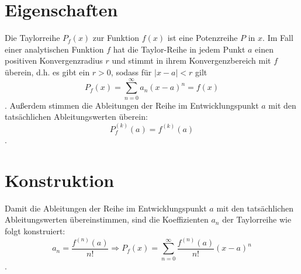 \section{Eigenschaften}
Die Taylorreihe \(P_f(x)\) zur Funktion \(f(x)\) ist eine Potenzreihe \(P\) in \(x\). Im Fall einer
analytischen Funktion \(f\) hat die Taylor-Reihe in jedem Punkt \(a\) einen positiven
Konvergenzradius \(r\) und stimmt in ihrem Konvergenzbereich mit \(f\) überein, d.h. es gibt ein
\(r>0\), sodass für \(|x-a|<r\) gilt
\begin{equation}
    P_f(x) = \sum_{n=0}^\infty a_n (x-a)^n = f(x)
\end{equation}.
Außerdem stimmen die Ableitungen der Reihe im Entwicklungspunkt \(a\) mit den tatsächlichen
Ableitungswerten überein:
\begin{equation}
    P_f^{(k)}(a) = f^{(k)}(a)
\end{equation}
.
    
\section{Konstruktion}
Damit die Ableitungen der Reihe im Entwicklungspunkt \(a\) mit den tatsächlichen Ableitungswerten
übereinstimmen, sind die Koeffizienten \(a_n\) der Taylorreihe wie folgt konstruiert:
\begin{equation}
    \label{eq:konstruktion}
    a_n = \frac{f^{(n)}(a)}{n!} \Rightarrow P_f(x) = \sum_{n=0}^\infty \frac{f^{(n)}(a)}{n!} (x-a)^n
\end{equation}
.

